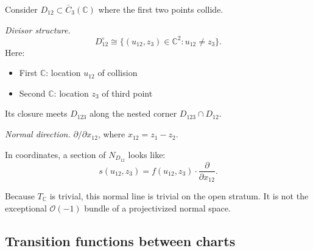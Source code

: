 \begin{example}\label{ex:normal-bundle-d12}
Consider $D_{12} \subset \overline{C}_3(\mathbb{C})$ where the first two points collide.

\emph{Divisor structure.}
\[
D_{12}^{\circ}\cong
\{(u_{12},z_3)\in\mathbb C^2:u_{12}\neq z_3\}.
\]
Here:
\begin{itemize}
\item First $\mathbb{C}$: location $u_{12}$ of collision
\item Second $\mathbb{C}$: location $z_3$ of third point
\end{itemize}
Its closure meets $D_{123}$ along the nested corner
$D_{123}\cap D_{12}$.

\emph{Normal direction.} $\partial/\partial x_{12}$, where
$x_{12}=z_1-z_2$.

In coordinates, a section of $N_{D_{12}}$ looks like:
\[
s(u_{12},z_3)=f(u_{12},z_3)\cdot
\frac{\partial}{\partial x_{12}}.
\]

Because $T_{\mathbb C}$ is trivial, this normal line is trivial on the
open stratum. It is not the exceptional $\mathcal O(-1)$ bundle of a
projectivized normal space.
\end{example}

\subsection{Transition functions between charts}

